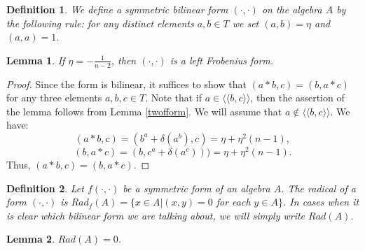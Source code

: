 \documentclass[12pt]{article}
\newcommand\R{\mathbb{R}}
\newcommand\dl{\delta}
\newcommand\la{\langle}
\newcommand\ra{\rangle}
\newcommand\lla{\la\!\la}
\newcommand\rra{\ra\!\ra}
\newtheorem{lem}{Lemma}
\newtheorem{defi}{Definition}
\begin{document}


\begin{defi}
We define a symmetric bilinear form $(\cdot,\cdot)$ on the algebra $A$ by the following rule: for any distinct elements $a,b\in T$ we set $(a,b)=\eta$ and $(a,a)=1$.
\end{defi}

\begin{lem}
If $\eta=-\frac{1}{n-2}$, then $(\cdot,\cdot)$ is a left Frobenius form.
\end{lem}
\begin{proof}
Since the form is bilinear, it suffices to show that $(a*b,c)=(b,a*c)$ for any three elements $a,b,c\in T$. Note that if $a\in \lla b,c\rra$, then the assertion of the lemma follows from Lemma \ref{twofform}.
	We will assume that $a\not\in \lla b,c\rra$. We have: $$(a*b,c)=(b^a+\dl(a^b),c)=\eta+\eta^2(n-1),$$
	$$(b,a*c)=(b,c^a+\dl(a^c)))=\eta+\eta^2(n-1).$$
	 Thus, $(a*b,c)=(b,a*c)$.
\end{proof}
\begin{defi}
Let $f(\cdot,\cdot)$ be a symmetric form of an algebra $A$. The radical of a form $(\cdot,\cdot)$ is $Rad_f(A)=\{x\in A|(x,y)=0$ for each $y\in A\}$. In cases when it is clear which bilinear form we are talking about, we will simply write $Rad(A)$.
\end{defi}
\begin{lem}\label{Tr}
$Rad(A)=0$.
\end{lem}
\end{document}

